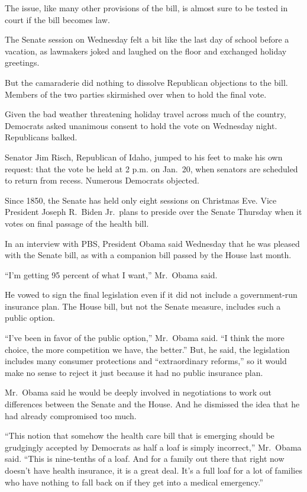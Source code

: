 ﻿\documentclass[12pt]{article}
\begin{document}
The issue, like many other provisions of the bill, is almost sure to be tested in court if the bill
becomes law.

The Senate session on Wednesday felt a bit like the last day of school before a vacation, as
lawmakers joked and laughed on the floor and exchanged holiday greetings.

But the camaraderie did nothing to dissolve Republican objections to the bill. Members of the two
parties skirmished over when to hold the final vote.

Given the bad weather threatening holiday travel across much of the country, Democrats asked
unanimous consent to hold the vote on Wednesday night. Republicans balked.

Senator Jim Risch, Republican of Idaho, jumped to his feet to make his own request: that the vote be
held at 2 p.m. on Jan.~20, when senators are scheduled to return from recess. Numerous Democrats
objected.

Since 1850, the Senate has held only eight sessions on Christmas Eve. Vice President Joseph R.~Biden
Jr.~plans to preside over the Senate Thursday when it votes on final passage of the health bill.

In an interview with PBS, President Obama said Wednesday that he was pleased with the Senate bill,
as with a companion bill passed by the House last month.

``I'm getting 95 percent of what I want,'' Mr.~Obama said.

He vowed to sign the final legislation even if it did not include a government-run insurance plan.
The House bill, but not the Senate measure, includes such a public option.

``I've been in favor of the public option,'' Mr.~Obama said. ``I think the more choice, the more
competition we have, the better.'' But, he said, the legislation includes many consumer protections
and ``extraordinary reforms,'' so it would make no sense to reject it just because it had no public
insurance plan.

Mr.~Obama said he would be deeply involved in negotiations to work out differences between the
Senate and the House. And he dismissed the idea that he had already compromised too much.

``This notion that somehow the health care bill that is emerging should be grudgingly accepted by
Democrats as half a loaf is simply incorrect,'' Mr.~Obama said. ``This is nine-tenths of a loaf. And
for a family out there that right now doesn't have health insurance, it is a great deal. It's a full
loaf for a lot of families who have nothing to fall back on if they get into a medical emergency.''
\end{document}
